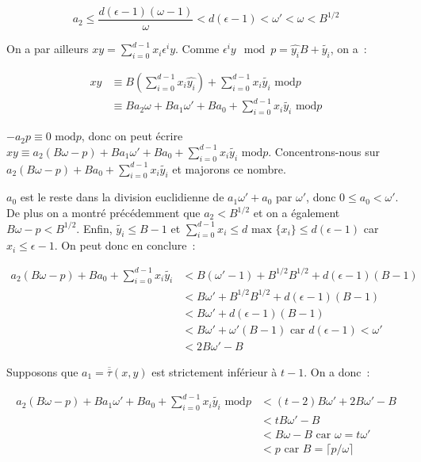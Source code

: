 		$$a_2 \leq \frac{d(\epsilon - 1)(\omega - 1)}{\omega} < d(\epsilon - 1) < \omega' < \omega < B^{1/2} $$
		
		On a par ailleurs $xy = \sum_{i=0}^{d-1} x_i \epsilon^i y$. Comme $\epsilon^i y\mod p = \hat{y_i} B + \tilde{y_i}$, on a~:
		
		\begin{align*}
        xy &\equiv B(\sum_{i=0}^{d-1} x_i \hat{y_i}) + \sum_{i=0}^{d-1} x_i \tilde{y_i} \text{\ mod} p \\
           &\equiv B a_2\omega + B a_1\omega' + B a_0 + \sum_{i=0}^{d-1} x_i \tilde{y_i} \text{\ mod} p
         \end{align*}
         
         $-a_2 p \equiv 0 \text{\ mod} p$, donc on peut écrire $xy \equiv a_2(B\omega - p) + B a_1\omega' + B a_0 + \sum_{i=0}^{d-1} x_i \tilde{y_i} \text{\ mod} p$. Concentrons-nous sur $a_2(B\omega - p) + B a_0 + \sum_{i=0}^{d-1} x_i \tilde{y_i}$ et majorons ce nombre.
         
         $a_0$ est le reste dans la division euclidienne de $a_1\omega' + a_0$ par $\omega'$, donc $0 \leq a_0 < \omega'$. De plus on a montré précédemment que $a_2 < B^{1/2}$ et on a également $B\omega - p < B^{1/2}$. Enfin, $\tilde{y_i} \leq B - 1$ et $\sum_{i=0}^{d-1} x_i \leq d \text{\ max $\{x_i\}$} \leq d(\epsilon - 1)$ car $x_i \leq \epsilon - 1$. On peut donc en conclure~:
         
         \begin{align*}
         a_2(B\omega - p) + B a_0 + \sum_{i=0}^{d-1} x_i \tilde{y_i} &< B(\omega' - 1) + B^{1/2}B^{1/2} + d(\epsilon - 1)(B - 1) \\
                                 &< B\omega' + B^{1/2}B^{1/2} + d(\epsilon - 1)(B - 1) \\
                                 &< B\omega' + d(\epsilon - 1)(B - 1) \\
                                 &< B\omega' + \omega'(B - 1) \text{\ car $d(\epsilon - 1) < \omega'$} \\
                                 &< 2B\omega' - B
         \end{align*}
         
         Supposons que $a_1 = \overline{\overline{\tau}}(x,y)$ est strictement inférieur à $t - 1$. On a donc~:
         
         \begin{align*}
         a_2(B\omega - p) + B a_1\omega' + B a_0 + \sum_{i=0}^{d-1} x_i \tilde{y_i} \text{\ mod} p &< (t - 2)B\omega' + 2B\omega' - B \\
                               &< tB\omega' - B \\
                               &< B\omega - B \text{\ car $\omega = t\omega'$} \\
                               &< p \text{\ car $B = \lceil p/\omega \rceil$}
         \end{align*}
         
